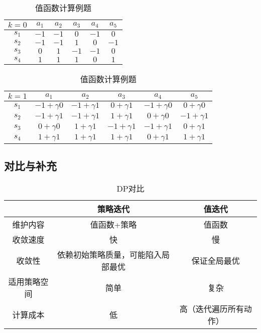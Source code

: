 \documentclass[
12pt, %
a4paper, 
oneside, %
headinclude,footinclude, %
]{scrartcl}
\begin{document}
\begin{table}[H]
\small
\centering
\begin{tabular}{|c|c|c|c|c|c|}
\hline
$ k = 0 $ & $ a_1 $ & $ a_2 $ & $ a_3 $ & $ a_4 $ & $ a_5 $ \\
\hline
$ s_1 $ & $ -1 $ & $ -1 $ & $ 0 $ & $ -1 $ & $ 0 $ \\
\hline
$ s_2 $ & $ -1 $ & $ -1 $ & $ 1 $ & $ 0 $ & $ -1 $ \\
\hline
$ s_3 $ & $ 0 $ & $ 1 $ & $ -1 $ & $ -1 $ & $ 0 $ \\
\hline
$ s_4 $ & $ 1 $ & $ 1 $ & $ 1 $ & $ 0 $ & $ 1 $ \\
\hline
\end{tabular}
\begin{tabular}{|c|c|c|c|c|c|}
\hline
$ k = 1 $ & $ a_1 $ & $ a_2 $ & $ a_3 $ & $ a_4 $ & $ a_5 $ \\
\hline
$ s_1 $ & $ -1 + \gamma 0 $ & $ -1 + \gamma 1 $ & $ 0 + \gamma 1 $ & $ -1 + \gamma 0 $ & $ 0 + \gamma 0 $ \\
\hline
$ s_2 $ & $ -1 + \gamma 1 $ & $ -1 + \gamma 1 $ & $ 1 + \gamma 1 $ & $ 0 + \gamma 0 $ & $ -1 + \gamma 1 $ \\
\hline
$ s_3 $ & $ 0 + \gamma 0 $ & $ 1 + \gamma 1 $ & $ -1 + \gamma 1 $ & $ -1 + \gamma 1 $ & $ 0 + \gamma 1 $ \\
\hline
$ s_4 $ & $ 1 + \gamma 1 $ & $ 1 + \gamma 1 $ & $ 1 + \gamma 1 $ & $ 0 + \gamma 1 $ & $ 1 + \gamma 1 $ \\
\hline
\end{tabular}
\caption{值函数计算例题}
\end{table}
\subsection[对比与补充]{对比与补充}\label{sec:DP back}
\begin{table}[H]
\centering
\begin{tabular}{|c|c|c|}
\hline
& 策略迭代 & 值迭代 \\
\hline
维护内容 & 值函数+策略 & 值函数 \\
\hline
收敛速度 & 快 & 慢 \\
\hline
收敛性 & 依赖初始策略质量，可能陷入局部最优 & 保证全局最优 \\
\hline
适用策略空间 & 简单 & 复杂 \\
\hline
计算成本 & 低 & 高（迭代遍历所有动作） \\
\hline
\end{tabular}
\caption{DP对比}
\end{table}
\end{document}
